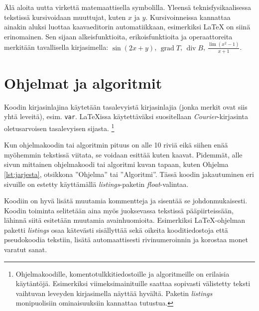 \documentclass[globalnumbering,centeredcaptions,draftfooter]{tutthesis/tutthesis} %
\begin{document}
Älä aloita uutta virkettä matemaattisella symbolilla.
Yleensä teknisfysikaalisessa tekstissä kursivoidaan muuttujat, kuten $x$ ja $y$.
Kursivoinneissa kannattaa ainakin aluksi luottaa kaavaeditorin automatiikkaan, esimerkiksi LaTeX \citep{Oetiker2011} on siinä erinomainen.
Sen sijaan alkeisfunktioita, erikoisfunktioita ja operaattoreita merkitään tavallisella kirjasimella: $\sin (2x+y)$, $\operatorname{grad} T$, $\operatorname{div} B$, $\frac{\lim (x^2 - 1)}{x + 1}$.


\section{Ohjelmat ja algoritmit}

Koodin kirjasinlajina käytetään tasalevyistä kirjasinlajia (jonka merkit ovat siis yhtä leveitä), esim. \texttt{var}.
LaTeXissa käytettäväksi suositellaan \emph{Courier}-kirjasinta oletusarvoisen tasalevyisen sijasta.
\footnote{Ohjelmakoodille, komentotulkkitiedostoille ja algoritmeille on erilaisia käytäntöjä.
  Esimerkiksi viimeksimainituille saattaa sopivasti välistetty teksti vaihtuvan leveyden kirjasimella näyttää hyvältä.
  Paketin \emph{listings} monipuolisiin ominaisuuksiin kannattaa tutustua.}

Kun ohjelmakoodin tai algoritmin pituus on alle 10 riviä eikä siihen enää myöhemmin tekstissä viitata, se voidaan esittää kuten kaavat.
Pidemmät, alle sivun mittainen ohjelmakoodi tai algoritmi kuvan tapaan, kuten Ohjelma \ref{lst:jarjesta}, otsikkona ''Ohjelma'' tai ''Algoritmi''.
Tässä koodin jakautuminen eri sivuille on estetty käyttämällä \emph{listings}-paketin \emph{float}-valintaa.

Koodiin on hyvä lisätä muutamia kommentteja ja sisentää se johdonmukaisesti.
Koodin toiminta selitetään aina myös juoksevassa tekstissä pääpiirteissään, lähinnä siitä esitetään muutamia avainhuomioita.
Esimerkiksi LaTeX-ohjelman paketti \emph{listings} \citep{Heinz2006, Oetiker2011} osaa kätevästi sisällyttää sekä oikeita kooditiedostoja että pseudokoodia tekstiin, lisätä automaattisesti rivinumeroinnin ja korostaa monet varatut sanat.
\end{document}
